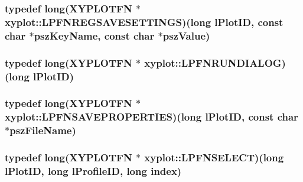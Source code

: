 \hypertarget{namespacexyplot_a852637cd21abfcac7de9635bbd175db7}{
\subsubsection[{L\-P\-F\-N\-R\-E\-G\-S\-A\-V\-E\-S\-E\-T\-T\-I\-N\-G\-S}]{\setlength{\rightskip}{0pt plus 5cm}typedef {\bf long}({\bf X\-Y\-P\-L\-O\-T\-F\-N} $\ast$ xyplot\-::\-L\-P\-F\-N\-R\-E\-G\-S\-A\-V\-E\-S\-E\-T\-T\-I\-N\-G\-S)({\bf long} l\-Plot\-I\-D, const char $\ast$psz\-Key\-Name, const char $\ast$psz\-Value)}}\label{namespacexyplot_a852637cd21abfcac7de9635bbd175db7}
\hypertarget{namespacexyplot_a63fcd576a6d31af2655357ffa3ea7b74}{
\subsubsection[{L\-P\-F\-N\-R\-U\-N\-D\-I\-A\-L\-O\-G}]{\setlength{\rightskip}{0pt plus 5cm}typedef {\bf long}({\bf X\-Y\-P\-L\-O\-T\-F\-N} $\ast$ xyplot\-::\-L\-P\-F\-N\-R\-U\-N\-D\-I\-A\-L\-O\-G)({\bf long} l\-Plot\-I\-D)}}\label{namespacexyplot_a63fcd576a6d31af2655357ffa3ea7b74}
\hypertarget{namespacexyplot_a097f19903e90904e363a37bd0418d16b}{
\subsubsection[{L\-P\-F\-N\-S\-A\-V\-E\-P\-R\-O\-P\-E\-R\-T\-I\-E\-S}]{\setlength{\rightskip}{0pt plus 5cm}typedef {\bf long}({\bf X\-Y\-P\-L\-O\-T\-F\-N} $\ast$ xyplot\-::\-L\-P\-F\-N\-S\-A\-V\-E\-P\-R\-O\-P\-E\-R\-T\-I\-E\-S)({\bf long} l\-Plot\-I\-D, const char $\ast$psz\-File\-Name)}}\label{namespacexyplot_a097f19903e90904e363a37bd0418d16b}
\hypertarget{namespacexyplot_a8a0a6d08dd052f79805399d35f400536}{
\subsubsection[{L\-P\-F\-N\-S\-E\-L\-E\-C\-T}]{\setlength{\rightskip}{0pt plus 5cm}typedef {\bf long}({\bf X\-Y\-P\-L\-O\-T\-F\-N} $\ast$ xyplot\-::\-L\-P\-F\-N\-S\-E\-L\-E\-C\-T)({\bf long} l\-Plot\-I\-D, {\bf long} {\bf l\-Profile\-I\-D}, {\bf long} index)}}\label{namespacexyplot_a8a0a6d08dd052f79805399d35f400536}

